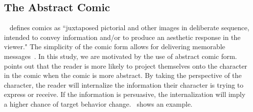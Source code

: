 
\subsection{The Abstract Comic}
~\textcite{scott1993understanding} defines comics as ``juxtaposed pictorial and other images in deliberate sequence, intended to convey information and/or to produce an aesthetic response in the viewer." The simplicity of the comic form allows for delivering memorable messages~\textcite{scott1993understanding}. In this study, we are motivated by the use of abstract comic form.~\textcite{scott1993understanding} points out that the reader is more likely to project themselves onto the character in the comic when the comic is more abstract. By taking the perspective of the character, the reader will internalize the information their character is trying to express or receive. If the information is persuasive, the internalization will imply a higher chance of target behavior change.~ shows an example.




